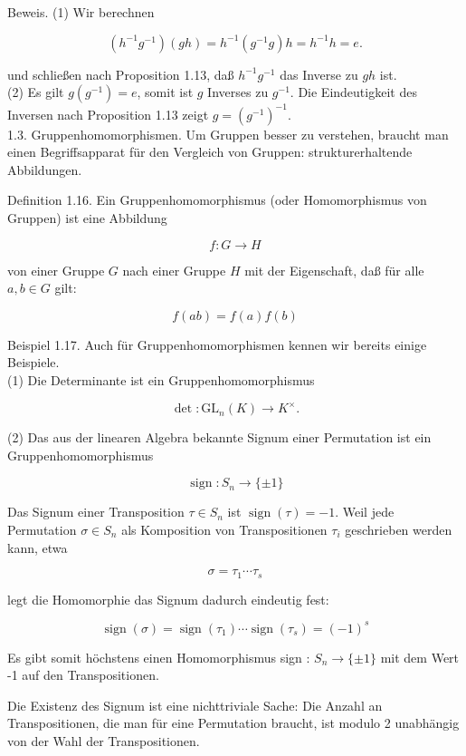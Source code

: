 \documentclass[10pt, letterpaper]{article}
\begin{document}
Beweis. (1) Wir berechnen

$$
\left(h^{-1} g^{-1}\right)(g h)=h^{-1}\left(g^{-1} g\right) h=h^{-1} h=e .
$$

und schließen nach Proposition 1.13, daß $h^{-1} g^{-1}$ das Inverse zu $g h$ ist.\\
(2) Es gilt $g\left(g^{-1}\right)=e$, somit ist $g$ Inverses zu $g^{-1}$. Die Eindeutigkeit des Inversen nach Proposition 1.13 zeigt $g=\left(g^{-1}\right)^{-1}$.\\
1.3. Gruppenhomomorphismen. Um Gruppen besser zu verstehen, braucht man einen Begriffsapparat für den Vergleich von Gruppen: strukturerhaltende Abbildungen.

Definition 1.16. Ein Gruppenhomomorphismus (oder Homomorphismus von Gruppen) ist eine Abbildung

$$
f: G \rightarrow H
$$

von einer Gruppe $G$ nach einer Gruppe $H$ mit der Eigenschaft, daß für alle $a, b \in G$ gilt:

$$
f(a b)=f(a) f(b)
$$

Beispiel 1.17. Auch für Gruppenhomomorphismen kennen wir bereits einige Beispiele.\\
(1) Die Determinante ist ein Gruppenhomomorphismus

$$
\operatorname{det}: \mathrm{GL}_{n}(K) \rightarrow K^{\times} .
$$

(2) Das aus der linearen Algebra bekannte Signum einer Permutation ist ein Gruppenhomomorphismus

$$
\operatorname{sign}: S_{n} \rightarrow\{ \pm 1\}
$$

Das Signum einer Transposition $\tau \in S_{n}$ ist $\operatorname{sign}(\tau)=-1$. Weil jede Permutation $\sigma \in S_{n}$ als Komposition von Transpositionen $\tau_{i}$ geschrieben werden kann, etwa

$$
\sigma=\tau_{1} \cdots \tau_{s}
$$

legt die Homomorphie das Signum dadurch eindeutig fest:

$$
\operatorname{sign}(\sigma)=\operatorname{sign}\left(\tau_{1}\right) \cdots \operatorname{sign}\left(\tau_{s}\right)=(-1)^{s}
$$

Es gibt somit höchstens einen Homomorphismus sign : $S_{n} \rightarrow\{ \pm 1\}$ mit dem Wert -1 auf den Transpositionen.

Die Existenz des Signum ist eine nichttriviale Sache: Die Anzahl an Transpositionen, die man für eine Permutation braucht, ist modulo 2 unabhängig von der Wahl der Transpositionen.
\end{document}
